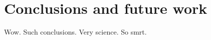 
\chapter{Conclusions and future work}
\label{ch:conclusions}

Wow. Such conclusions. Very science. So smrt.
